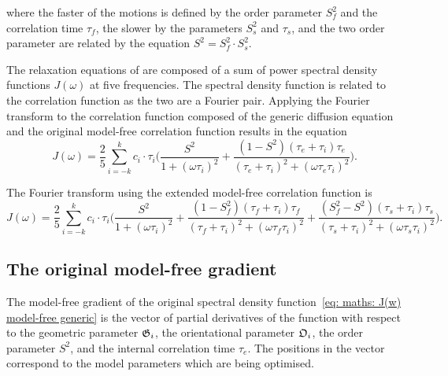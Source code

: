 \noindent where the faster of the motions is defined by the order parameter $S^2_f$ and the correlation time $\tau_f$, the slower by the parameters $S^2_s$ and $\tau_s$, and the two order parameter are related by the equation $S^2 = S^2_f \cdot S^2_s$.

The relaxation equations of \citet{Abragam61} are composed of a sum of power spectral density functions $J(\omega)$ at five frequencies.  The spectral density function is related to the correlation function as the two are a Fourier pair.  Applying the Fourier transform to the correlation function composed of the generic diffusion equation and the original model-free correlation function results in the equation
\begin{equation} \label{eq: maths: J(w) model-free generic}
    J(\omega) = \frac{2}{5} \sum_{i=-k}^k c_i \cdot \tau_i \Bigg(
        \frac{S^2}{1 + (\omega \tau_i)^2}
        + \frac{(1 - S^2)(\tau_e + \tau_i)\tau_e}{(\tau_e + \tau_i)^2 + (\omega \tau_e \tau_i)^2}
    \Bigg).
\end{equation}

The Fourier transform using the extended model-free correlation function is
\begin{equation} \label{eq: maths: J(w) model-free ext generic}
    J(\omega) = \frac{2}{5} \sum_{i=-k}^k c_i \cdot \tau_i \Bigg(
        \frac{S^2}{1 + (\omega \tau_i)^2}
        + \frac{(1 - S^2_f)(\tau_f + \tau_i)\tau_f}{(\tau_f + \tau_i)^2 + (\omega \tau_f \tau_i)^2}
        + \frac{(S^2_f - S^2)(\tau_s + \tau_i)\tau_s}{(\tau_s + \tau_i)^2 + (\omega \tau_s \tau_i)^2}
    \Bigg).
\end{equation}




\subsection{The original model-free gradient}

The model-free gradient of the original spectral density function~\eqref{eq: maths: J(w) model-free generic} is the vector of partial derivatives of the function with respect to the geometric parameter $\mathfrak{G}_i$, the orientational parameter $\mathfrak{O}_i$, the order parameter $S^2$, and the internal correlation time $\tau_e$.  The positions in the vector correspond to the model parameters which are being optimised.



